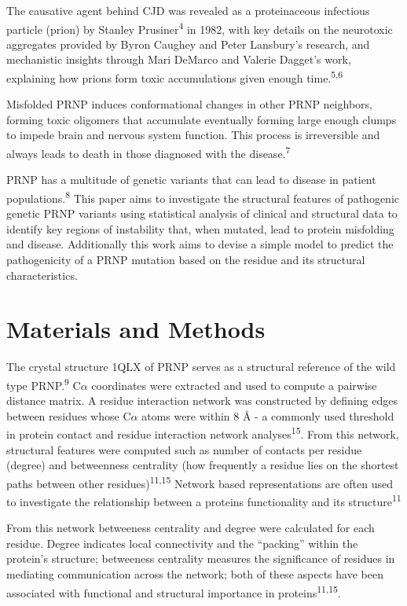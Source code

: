 \documentclass[
  twocolumn]{biophys-new-mod}
\begin{document}
The causative agent behind CJD was revealed as a proteinaceous
infectious particle (prion) by Stanley Prusiner\textsuperscript{4} in
1982, with key details on the neurotoxic aggregates provided by Byron
Caughey and Peter Lansbury's research, and mechanistic insights through
Mari DeMarco and Valerie Dagget's work, explaining how prions form toxic
accumulations given enough time.\textsuperscript{5,6}

Misfolded PRNP induces conformational changes in other PRNP neighbors,
forming toxic oligomers that accumulate eventually forming large enough
clumps to impede brain and nervous system function. This process is
irreversible and always leads to death in those diagnosed with the
disease.\textsuperscript{7}

PRNP has a multitude of genetic variants that can lead to disease in
patient populations.\textsuperscript{8} This paper aims to investigate
the structural features of pathogenic genetic PRNP variants using
statistical analysis of clinical and structural data to identify key
regions of instability that, when mutated, lead to protein misfolding
and disease. Additionally this work aims to devise a simple model to
predict the pathogenicity of a PRNP mutation based on the residue and
its structural characteristics.

\section{Materials and Methods}\label{materials-and-methods}

The crystal structure 1QLX of PRNP serves as a structural reference of
the wild type PRNP.\textsuperscript{9} C\(\alpha\) coordinates were
extracted and used to compute a pairwise distance matrix. A residue
interaction network was constructed by defining edges between residues
whose C\(\alpha\) atoms were within 8 Å - a commonly used threshold in
protein contact and residue interaction network
analyses\textsuperscript{15}. From this network, structural features
were computed such as number of contacts per residue (degree) and
betweenness centrality (how frequently a residue lies on the shortest
paths between other residues)\textsuperscript{11,15} Network based
representations are often used to investigate the relationship between a
proteins functionality and its structure\textsuperscript{11}

From this network betweeness centrality and degree were calculated for
each residue. Degree indicates local connectivity and the ``packing''
within the protein's structure; betweeness centrality measures the
significance of residues in mediating communication across the network;
both of these aspects have been associated with functional and
structural importance in proteins\textsuperscript{11,15}.
\end{document}
